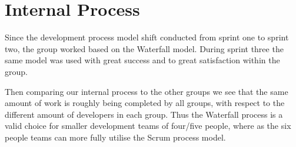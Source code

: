  \section{Internal Process}
Since the development process model shift conducted from sprint one to sprint two, the group worked based on the Waterfall model. 
During sprint three the same model was used with great success and to great satisfaction within the group. 

Then comparing our internal process to the other groups we see that the same amount of work is roughly being completed by all groups, with respect to the different amount of developers in each group. 
Thus the Waterfall process is a valid choice for smaller development teams of four/five people, where as the six people teams can more fully utilise the Scrum process model. 
